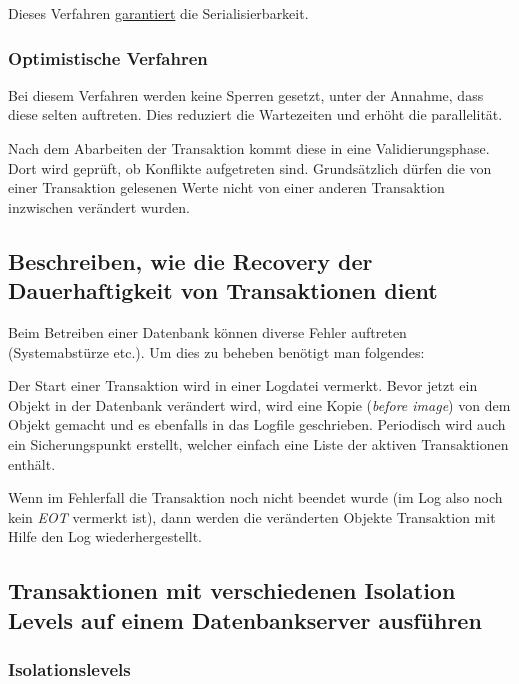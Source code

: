 Dieses Verfahren \underline{garantiert} die Serialisierbarkeit.


\subsubsection{Optimistische Verfahren}
Bei diesem Verfahren werden keine Sperren gesetzt, unter der Annahme, dass diese selten auftreten. Dies reduziert die Wartezeiten und erhöht die parallelität.

Nach dem Abarbeiten der Transaktion kommt diese in eine Validierungsphase. Dort wird geprüft, ob Konflikte aufgetreten sind. Grundsätzlich dürfen die von einer Transaktion gelesenen Werte nicht von einer anderen Transaktion inzwischen verändert wurden.

\subsection{Beschreiben, wie die Recovery der Dauerhaftigkeit von Transaktionen dient}

Beim Betreiben einer Datenbank können diverse Fehler auftreten (Systemabstürze etc.). Um dies zu beheben benötigt man folgendes:

Der Start einer Transaktion wird in einer Logdatei vermerkt. Bevor jetzt ein Objekt in der Datenbank verändert wird, wird eine Kopie (\emph{before image}) von dem Objekt gemacht und es ebenfalls in das Logfile geschrieben. Periodisch wird auch ein Sicherungspunkt erstellt, welcher einfach eine Liste der aktiven Transaktionen enthält.

Wenn im Fehlerfall die Transaktion noch nicht beendet wurde (im Log also noch kein \emph{EOT} vermerkt ist), dann werden die veränderten Objekte Transaktion mit Hilfe den Log wiederhergestellt.

\subsection{Transaktionen mit verschiedenen Isolation Levels auf einem Datenbankserver ausführen}

\subsubsection{Isolationslevels}

